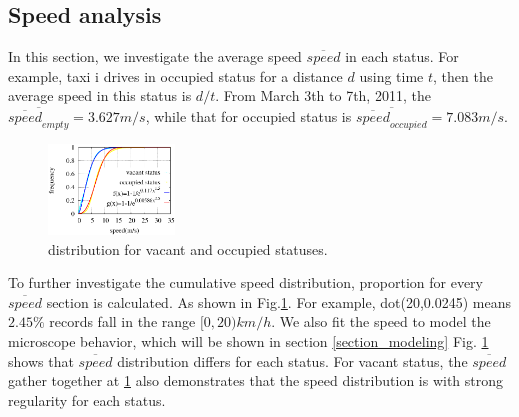 \subsection{Speed analysis}
In this section, we investigate the average speed $\overline{speed}$ in each status. For example, taxi i drives in occupied status for a distance $d$ using time $t$, then the average speed in this status is $d/t$.
From March 3th to 7th, 2011, the $\overline{\overline{speed}_{empty}} = 3.627 m/s$, while that for occupied status is $\overline{\overline{speed}_{occupied}}=7.083 m/s$.

\begin{figure}[!h]
\centering
\includegraphics[width=0.3\textwidth]{figures_201103/fit/speedfit.eps}
\caption{ distribution for vacant and occupied statuses.}\label{figure_speed_distribution}
\end{figure}

To further investigate the cumulative speed distribution, proportion for every $\overline{speed}$ section is calculated.
As shown in Fig.\ref{figure_speed_distribution}. For example, dot(20,0.0245) means $2.45\%$ records fall in the range $[0,20)km/h$. We also fit the speed to model the microscope behavior, which will be shown in section \ref{section_modeling}
Fig. \ref{figure_speed_distribution} shows that $\overline{speed}$ distribution differs for each status. For vacant status, the $\overline{speed}$ gather together at  \ref{figure_speed_distribution} also demonstrates that the speed distribution is with strong regularity for each status.


